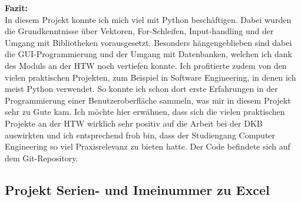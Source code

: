 \noindent
\textbf{Fazit:}
\\ 

\noindent
In diesem Projekt konnte ich mich viel mit Python beschäftigen. Dabei wurden die Grundkenntnisse über Vektoren, For-Schleifen, Input-handling und der Umgang mit Bibliotheken vorausgesetzt. Besonders hängengeblieben sind dabei die GUI-Programmierung und der Umgang mit Datenbanken, welchen ich dank des Moduls an der HTW noch vertiefen konnte. Ich profitierte zudem von den vielen praktischen Projekten, zum Beispiel in Software Engineering, in denen ich meist Python verwendet. So konnte ich schon dort erste Erfahrungen in der Programmierung einer Benutzeroberfläche sammeln, was mir in diesem Projekt sehr zu Gute kam. Ich möchte hier erwähnen, dass sich die vielen praktischen Projekte an der HTW wirklich sehr positiv auf die Arbeit bei der DKB auswirkten und ich entsprechend froh bin, dass der Studiengang Computer Engineering so viel Praxisrelevanz zu bieten hatte. Der Code befindete sich auf dem Git-Repository.

\subsection{Projekt Serien- und Imeinummer zu Excel}
\label{Projekt Serien- und Imeinummer zu Excell}

